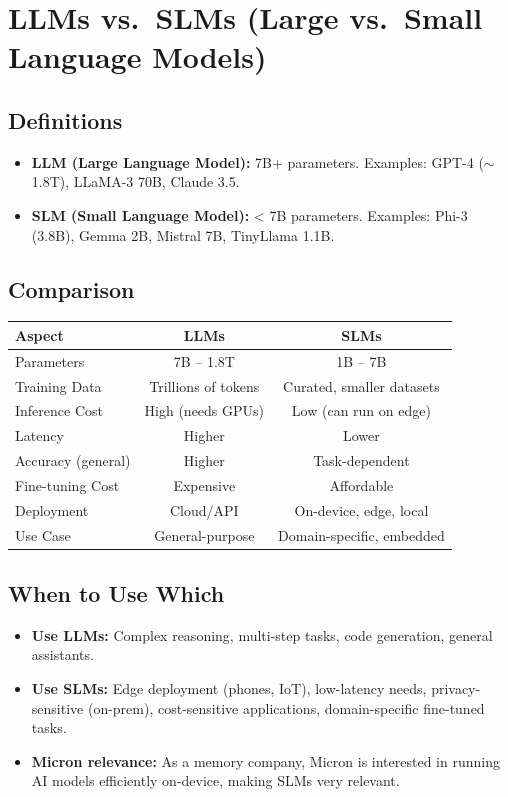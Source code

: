 \documentclass[11pt,a4paper]{article}
\begin{document}
\section{LLMs vs.\ SLMs (Large vs.\ Small Language Models)}

\subsection{Definitions}
\begin{itemize}[nosep]
  \item \textbf{LLM (Large Language Model):} 7B+ parameters. Examples: GPT-4 ($\sim$1.8T), LLaMA-3 70B, Claude 3.5.
  \item \textbf{SLM (Small Language Model):} < 7B parameters. Examples: Phi-3 (3.8B), Gemma 2B, Mistral 7B, TinyLlama 1.1B.
\end{itemize}

\subsection{Comparison}

\begin{center}
\begin{tabular}{lcc}
\toprule
\textbf{Aspect} & \textbf{LLMs} & \textbf{SLMs} \\
\midrule
Parameters & 7B -- 1.8T & 1B -- 7B \\
Training Data & Trillions of tokens & Curated, smaller datasets \\
Inference Cost & High (needs GPUs) & Low (can run on edge) \\
Latency & Higher & Lower \\
Accuracy (general) & Higher & Task-dependent \\
Fine-tuning Cost & Expensive & Affordable \\
Deployment & Cloud/API & On-device, edge, local \\
Use Case & General-purpose & Domain-specific, embedded \\
\bottomrule
\end{tabular}
\end{center}

\subsection{When to Use Which}
\begin{itemize}[nosep]
  \item \textbf{Use LLMs:} Complex reasoning, multi-step tasks, code generation, general assistants.
  \item \textbf{Use SLMs:} Edge deployment (phones, IoT), low-latency needs, privacy-sensitive (on-prem), cost-sensitive applications, domain-specific fine-tuned tasks.
  \item \textbf{Micron relevance:} As a memory company, Micron is interested in running AI models efficiently on-device, making SLMs very relevant.
\end{itemize}
\end{document}
